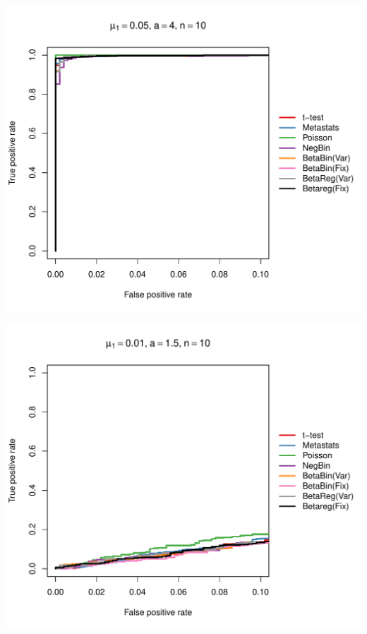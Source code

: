 \documentclass[12pt]{article}\usepackage{graphicx, color}
\makeatletter
\def\maxwidth{ %
  \ifdim\Gin@nat@width>\linewidth
    \linewidth
  \else
    \Gin@nat@width
  \fi
}
\newenvironment{knitrout}{}{} %
\makeatother
\begin{document}
\begin{knitrout}
{\centering \includegraphics[width=\maxwidth]{figure/rocs21} 

}




{\centering \includegraphics[width=\maxwidth]{figure/rocs22} 

}





\end{knitrout}
\end{document}
